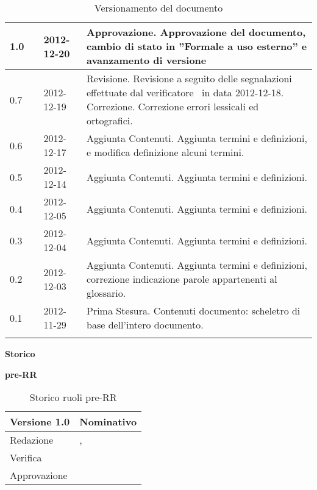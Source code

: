 \begin{longtable}{p{} p{} p{} p{}}
	    \midrule
		    1.0	&	\SL	&	2012-12-20		&	Approvazione.\newline
										Approvazione del documento, cambio di stato in ”Formale a uso esterno” e avanzamento di versione\\
	    \midrule
		    0.7	&	\FZ	&	2012-12-19		&	Revisione.\newline
										Revisione a seguito delle segnalazioni effettuate dal verificatore \MB~in data 2012-12-18.\newline
										Correzione.\newline
										Correzione errori lessicali ed ortografici.\\
	    \midrule
		    0.6	&	\AB	&	2012-12-17		&	Aggiunta Contenuti.\newline 
										Aggiunta termini e definizioni, e modifica definizione alcuni termini.\\
	    \midrule
		    0.5	&	\AB	&	2012-12-14		&	Aggiunta Contenuti.\newline 
										Aggiunta termini e definizioni.\\
	    \midrule
		    0.4	&	\AB	&	2012-12-05		&	Aggiunta Contenuti.\newline 
										Aggiunta termini e definizioni.\\
	    \midrule
		    0.3	&	\FZ	&	2012-12-04		&	Aggiunta Contenuti.\newline 
										Aggiunta termini e definizioni.\\
	    \midrule
		    0.2	&	\FZ	&	2012-12-03		&	Aggiunta Contenuti.\newline 
										Aggiunta termini e definizioni, correzione indicazione
													parole appartenenti al glossario.\\
	    \midrule
		    0.1	&	\AB	&	2012-11-29		&	Prima Stesura.\newline 
										Contenuti documento: scheletro di base dell'intero documento.\\
	    \bottomrule

	\caption{Versionamento del documento}
	\end{longtable}

\newpage

\Large{\textbf{Storico }}\\
\normalsize

\textbf{pre-RR}

\begin{table}[h]
\begin{center}

\begin{tabular}{p{} p{}}
\toprule
\textbf{Versione 1.0}	&	\textbf{Nominativo}\\
\midrule
\midrule
Redazione	&	\AB, \FZ \\
\midrule
Verifica &	\MB	\\
\midrule
Approvazione	&	\SL	\\
\bottomrule
\end{tabular}
\caption{Storico ruoli pre-RR}
\label{tabVers1}
\end{center}
\end{table}


